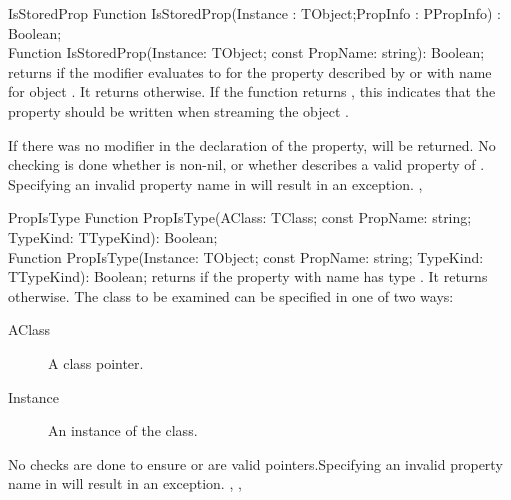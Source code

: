 \begin{function}{IsStoredProp}
\Declaration
Function IsStoredProp(Instance : TObject;PropInfo : PPropInfo) : Boolean;\\
Function IsStoredProp(Instance: TObject; const PropName: string): Boolean; 
\Description
{} returns  if the  modifier evaluates
to  for the property described by  or with name
 for object . 
It returns  otherwise. If the function returns
, this indicates that the property should be written when
streaming the object .

If there was no  modifier in the declaration of the property, 
 will be returned. 
\Errors
No checking is done whether  is non-nil, or whether
 describes a valid property of .
Specifying an invalid property name in  will result in an
 exception.                                                 
\SeeAlso
{}, 
\end{function}

\begin{function}{PropIsType}
\Declaration
Function PropIsType(AClass: TClass; 
                    const PropName: string; TypeKind: TTypeKind): Boolean;\\
Function PropIsType(Instance: TObject; 
                    const PropName: string; TypeKind: TTypeKind): Boolean;              
\Description
{} returns  if the property with name 
has type . It returns  otherwise. The class to be
examined can be specified in one of two ways:
\begin{description}
\item[AClass] A class pointer. 
\item[Instance] An instance of the class.
\end{description}
\Errors
No checks are done to ensure  or  are valid
pointers.Specifying an invalid property name in  will result
in an  exception.                                                 
\SeeAlso
{}, , 
\end{function}

